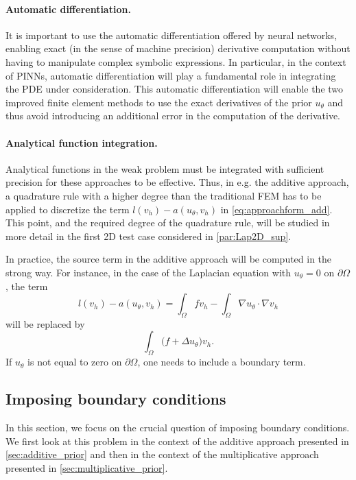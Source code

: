 \paragraph*{Automatic differentiation.}

It is important to use the automatic differentiation offered by neural networks, enabling exact (in the sense of machine precision) derivative computation without having to manipulate complex symbolic expressions. In particular, in the context of PINNs, automatic differentiation will play a fundamental role in integrating the PDE under consideration. This automatic differentiation will enable the two improved finite element methods to use the exact derivatives of the prior $u_\theta$ and thus avoid introducing an additional error in the computation of the derivative.

\paragraph*{Analytical function integration.}

Analytical functions in the weak problem must be integrated with sufficient precision for these approaches to be effective.
Thus, in e.g. the additive approach, a quadrature rule with a higher degree than the traditional FEM has to be applied to discretize the term $l(v_h) - a(u_\theta,v_h)$ in \eqref{eq:approachform_add}.
This point, and the required degree of the quadrature rule,
will be studied in more detail in the first 2D test case considered in \cref{par:Lap2D_sup}.



\begin{remark}
In practice, the source term in the additive approach will be computed in the strong way. For instance, in the case of the Laplacian equation with $u_{\theta}=0$ on $\partial\Omega$, the term
$$l(v_h)-a(u_{\theta},v_h)=\int_{\Omega}f v_h-\int_{\Omega}\nabla u_\theta \cdot \nabla v_h$$
will be replaced by
$$\int_{\Omega}\big(f+\Delta u_{\theta}\big)v_h.$$
If $u_{\theta}$ is not equal to zero on $\partial\Omega$, one needs to include a boundary term.
\end{remark}

\subsection{Imposing boundary conditions}\label{sec:boundary_conditions}

In this section, we focus on the crucial question of imposing boundary conditions. We first look at this problem in the context of the additive approach presented in \cref{sec:additive_prior} and then in the context of the multiplicative approach presented in \cref{sec:multiplicative_prior}.

